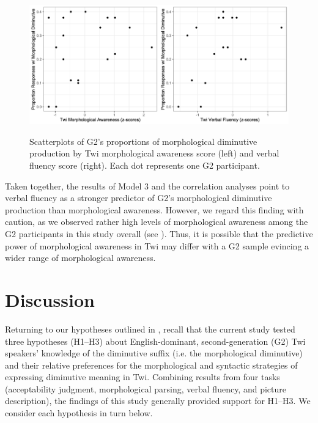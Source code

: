 \documentclass[output=paper,colorlinks,citecolor=brown]{langscibook}
\begin{document}
\begin{figure}
\includegraphics[width=0.5\textwidth]{figures/Fig3a.png}\includegraphics[width=0.5\textwidth]{figures/Fig3b.png}
\caption{Scatterplots of G2's proportions of morphological diminutive production by Twi morphological awareness score (left) and verbal fluency score (right). Each dot represents one G2 participant.}
\label{fig:IDscatterplots}
\end{figure}

Taken together, the results of Model 3 and the correlation analyses point to verbal fluency as a stronger predictor of G2's morphological diminutive production than morphological awareness. However, we regard this finding with caution, as we observed rather high levels of morphological awareness among the G2 participants in this study overall (see ). Thus, it is possible that the predictive power of morphological awareness in Twi may differ with a G2 sample evincing a wider range of morphological awareness.

\section{Discussion}
\label{DiscussionSec}

Returning to our hypotheses outlined in , recall that the current study tested three hypotheses (H1--H3) about English-dominant, second-generation (G2) Twi speakers' knowledge of the diminutive suffix (i.e. the morphological diminutive) and their relative preferences for the morphological and syntactic strategies of expressing diminutive meaning in Twi. Combining results from four tasks (acceptability judgment, morphological parsing, verbal fluency, and picture description), the findings of this study generally provided support for H1--H3. We consider each hypothesis in turn below.
\end{document}
